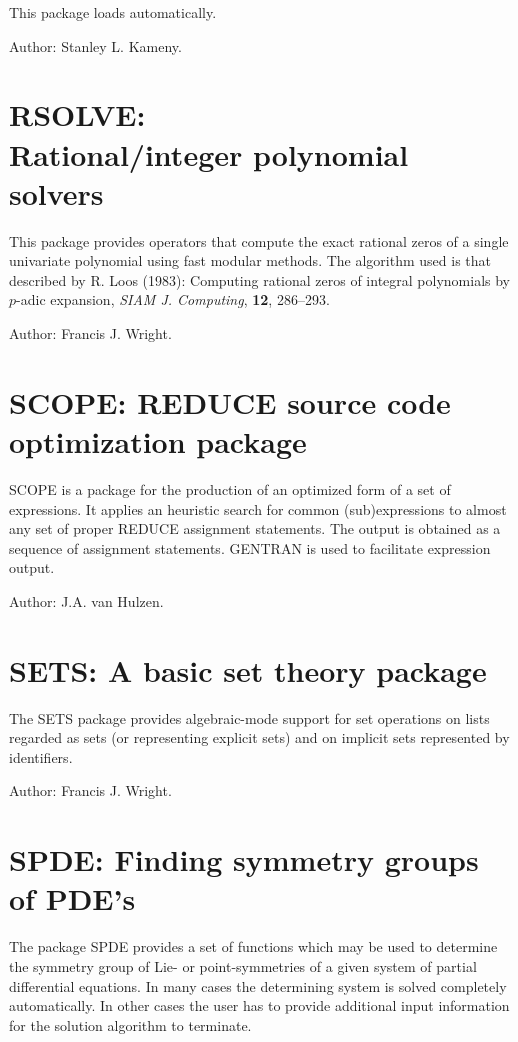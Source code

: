 This package loads automatically.

Author: Stanley L. Kameny.

\section[RSOLVE: Rational/integer polynomial solvers]%
        {RSOLVE: \protect\\ Rational/integer polynomial solvers}

This package provides operators that compute the exact rational zeros
of a single univariate polynomial using fast modular methods.  The
algorithm used is that described by R. Loos (1983): Computing rational
zeros of integral polynomials by $p$-adic expansion, \textit{SIAM J.
Computing}, \textbf{12}, 286--293.

Author: Francis J. Wright.

\section{SCOPE: REDUCE source code optimization package} 
\label{SCOPE}

SCOPE is a package for the production of an optimized form of a set of
expressions.  It applies an heuristic search for common (sub)expressions
to almost any set of proper REDUCE assignment statements.  The
output is obtained as a sequence of assignment statements.  GENTRAN is
used to facilitate expression output.

Author:  J.A. van Hulzen.

\section{SETS: A basic set theory package} 

The SETS package provides algebraic-mode support for set operations on
lists regarded as sets (or representing explicit sets) and on implicit
sets represented by identifiers.

Author: Francis J. Wright.

\section{SPDE: Finding symmetry groups of {PDE}'s}

The package SPDE provides a set of functions which may be used to
determine the symmetry group of Lie- or point-symmetries of a given system
of partial differential equations. In many cases the determining system is
solved completely automatically. In other cases the user has to provide
additional input information for the solution algorithm to terminate.

